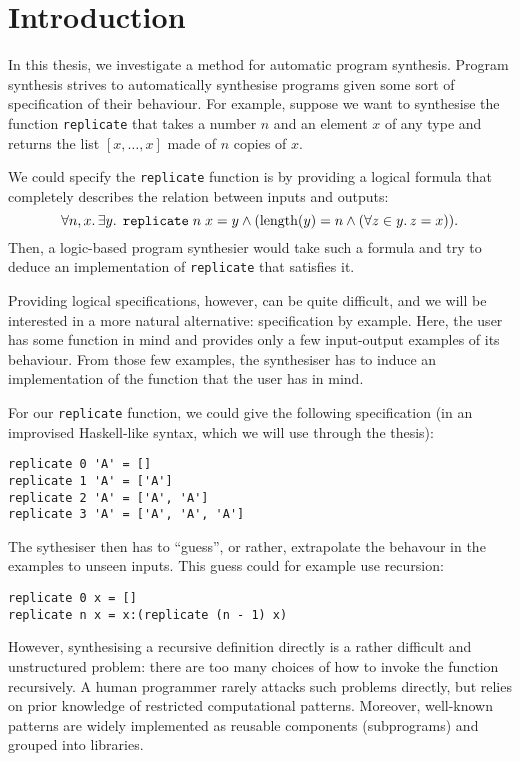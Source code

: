 \lstset{style=plain}

\chapter{Introduction}\label{ch:introduction}
In this thesis, we investigate a method for automatic program synthesis.  Program synthesis strives to automatically synthesise programs given some sort of specification of their behaviour.   For example, suppose we want to synthesise the function \lstinline!replicate! that takes a number $n$ and an element $x$ of any type and returns the list $[x, \dots, x]$ made of $n$ copies of $x$.

We could specify the \lstinline!replicate! function is by providing a logical formula that completely describes the relation between inputs and outputs: \[ \forall n, x \ldotp \exists y \ldotp \; \texttt{replicate} \; n \; x = y \land (\mathrm{length}(y) = n \land (\forall z \in y \ldotp z = x)). \]  Then, a logic-based program synthesier would take such a formula and try to deduce an implementation of \lstinline!replicate! that satisfies it.

Providing logical specifications, however, can be quite difficult, and we will be interested in a more natural alternative: specification by example.  Here, the user has some function in mind and provides only a few input-output examples of its behaviour.  From those few examples, the synthesiser has to induce an implementation of the function that the user has in mind.

For our \lstinline!replicate! function, we could give the following specification (in an improvised Haskell-like syntax, which we will use through the thesis):
\begin{lstlisting}[style=plain]
replicate 0 'A' = []
replicate 1 'A' = ['A']
replicate 2 'A' = ['A', 'A']
replicate 3 'A' = ['A', 'A', 'A']
\end{lstlisting}
The sythesiser then has to ``guess'', or rather, extrapolate the behavour in the examples to unseen inputs.  This guess could for example use recursion:
\begin{lstlisting}[style=plain]
replicate 0 x = []
replicate n x = x:(replicate (n - 1) x)
\end{lstlisting}

However, synthesising a recursive definition directly is a rather difficult and unstructured problem: there are too many choices of how to invoke the function recursively.  A human programmer rarely attacks such problems directly, but relies on prior knowledge of restricted computational patterns.  Moreover, well-known patterns are widely implemented as reusable components (subprograms) and grouped into libraries.

